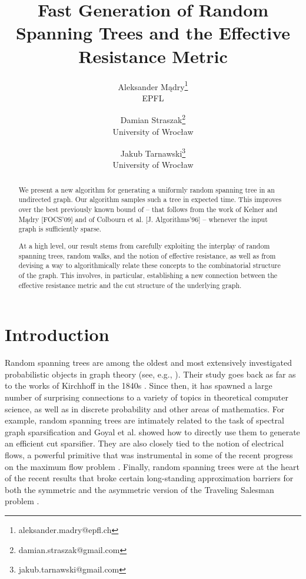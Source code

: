 \documentclass[11pt, letterpaper]{article}
\begin{document}
\title{Fast Generation of Random Spanning Trees and the Effective Resistance Metric}

\author{ Aleksander Mądry\thanks{aleksander.madry@epfl.ch} \\ EPFL \and Damian Straszak\thanks{damian.straszak@gmail.com} \\ University of Wrocław\and Jakub Tarnawski\thanks{jakub.tarnawski@gmail.com} \\ University of Wrocław}

\date{}
 
\maketitle

\begin{abstract}
We present a new algorithm for generating a uniformly random spanning tree in an undirected graph. Our algorithm samples such a tree in expected  time. This improves over the best previously known bound of  -- that follows from the work of Kelner and Mądry [FOCS'09] and of Colbourn et al. [J. Algorithms'96] -- whenever the input graph is sufficiently sparse.

At a high level, our result stems from carefully exploiting the interplay of random spanning trees, random walks, and the notion of effective resistance, as well as from devising a way to algorithmically relate these concepts to the combinatorial structure of the graph. This involves, in particular, establishing a new connection between the effective resistance metric and the cut structure of the underlying graph.  
\end{abstract}







\section{Introduction}\label{sec:introduction}

Random spanning trees are among the oldest and most extensively investigated probabilistic objects in graph theory (see, e.g., \cite{LyonsP13}). Their study goes back as far as to the works of Kirchhoff in the 1840s \cite{Kirchhoff47}. Since then, it has spawned a large number of surprising connections to a variety of topics in theoretical computer science, as well as in discrete probability and other areas of mathematics. For example, random spanning trees are intimately related to the task of spectral graph sparsification \cite{SpielmanS08,BatsonSS09} and Goyal et al. \cite{GoyalRV09} showed how to directly use them to generate an efficient cut sparsifier. They are also closely tied to the notion of electrical flows, a powerful primitive that was instrumental in some of the recent progress on the maximum flow problem \cite{ChristianoKMST11,Madry13}. Finally, random spanning trees were at the heart of the recent results that broke certain long-standing approximation barriers for both the symmetric and the asymmetric version of the Traveling Salesman problem \cite{AsadpourGMOS10,OveisGharanSS11}. 
\end{document}
